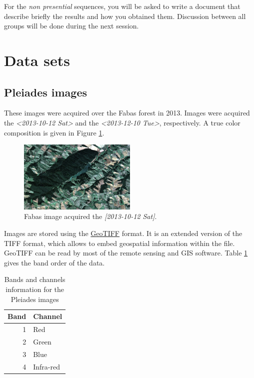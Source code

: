 \documentclass[a4paper,11pt,DIV=18]{scrartcl}
\begin{document}
For  the \emph{non  presential}  sequences,  you will  be  asked  to write  a
document  that  describe briefly  the  results  and how  you  obtained
them.  Discussion between  all groups  will  be done  during the  next
session.
\section{Data sets}
\label{sec:org7f8f9ac}
\subsection{Pleiades images}
\label{sec:org71e2f94}
These images were acquired over the  Fabas forest in 2013. Images were
acquired   the   \textit{<2013-10-12 Sat>    }    and   the   \textit{<2013-12-10 Tue>},
respectively. A true color composition is given in Figure \ref{fig:org0e9aee0}.

\begin{figure}[htbp]
\centering
\includegraphics[width=0.5\textwidth]{./figures/quicklook_fabas_12_10_2013.jpg}
\caption{\label{fig:org0e9aee0}
Fabas image acquired the \textit{[2013-10-12 Sat]}.}
\end{figure}

Images are stored using the \href{https://trac.osgeo.org/geotiff/}{GeoTIFF} format.  It is an extended version
of  the TIFF  format,  which allows  to  embed geospatial  information
within the file. GeoTIFF can be read by most of the remote sensing and
GIS software. Table \ref{tab:orgcb41403} gives the band order of the data.

\begin{table}[htbp]
\caption{\label{tab:orgcb41403}
Bands and channels information for the Pleiades images}
\centering
\begin{tabular}{rl}
\toprule
Band & Channel\\
\midrule
1 & Red\\
2 & Green\\
3 & Blue\\
4 & Infra-red\\
\bottomrule
\end{tabular}
\end{table}
\end{document}

